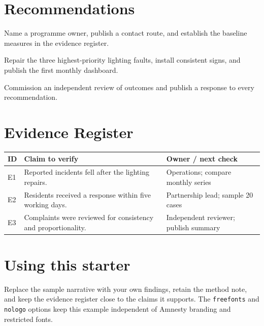 \documentclass[freefonts,nologo]{amnestyreport}
\begin{document}
\section{Recommendations}

\begin{description}[leftmargin=2.8cm,style=nextline]
  \item[Within 30 days] Name a programme owner, publish a contact route, and
    establish the baseline measures in the evidence register.
  \item[Within 90 days] Repair the three highest-priority lighting faults,
    install consistent signs, and publish the first monthly dashboard.
  \item[Within 180 days] Commission an independent review of outcomes and
    publish a response to every recommendation.
\end{description}

\section{Evidence Register}

\begin{tabularx}{\textwidth}{@{}l X X@{}}
  \toprule
  ID & Claim to verify & Owner / next check \\
  \midrule
  E1 & Reported incidents fell after the lighting repairs. & Operations; compare monthly series \\
  E2 & Residents received a response within five working days. & Partnership lead; sample 20 cases \\
  E3 & Complaints were reviewed for consistency and proportionality. & Independent reviewer; publish summary \\
  \bottomrule
\end{tabularx}

\section*{Using this starter}
Replace the sample narrative with your own findings, retain the method note, and
keep the evidence register close to the claims it supports. The \texttt{freefonts}
and \texttt{nologo} options keep this example independent of Amnesty branding and
restricted fonts.
\end{document}
